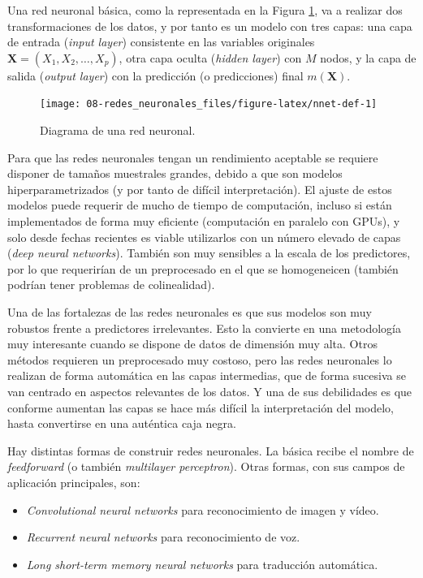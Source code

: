 \documentclass[
]{book}
\theoremstyle{break}
\theoremstyle{nonumberplain}
\begin{document}
Una red neuronal básica, como la representada en la Figura \ref{fig:nnet-def}, va a realizar dos transformaciones de los datos, y por tanto es un modelo con tres capas: una capa de entrada (\emph{input layer}) consistente en las variables originales \(\mathbf{X} = (X_1,X_2,\ldots, X_p)\), otra capa oculta (\emph{hidden layer}) con \(M\) nodos, y la capa de salida (\emph{output layer}) con la predicción (o predicciones) final \(m(\mathbf{X})\).



\begin{figure}[!htb]

{\centering \texttt{[image: 08-redes\_neuronales\_files/figure-latex/nnet-def-1]} 

}

\caption{Diagrama de una red neuronal.}\label{fig:nnet-def}
\end{figure}

Para que las redes neuronales tengan un rendimiento aceptable se requiere disponer de tamaños muestrales grandes, debido a que son modelos hiperparametrizados (y por tanto de difícil interpretación).
El ajuste de estos modelos puede requerir de mucho de tiempo de computación, incluso si están implementados de forma muy eficiente (computación en paralelo con GPUs), y solo desde fechas recientes es viable utilizarlos con un número elevado de capas (\emph{deep neural networks}).
También son muy sensibles a la escala de los predictores, por lo que requerirían de un preprocesado en el que se homogeneicen (también podrían tener problemas de colinealidad).

Una de las fortalezas de las redes neuronales es que sus modelos son muy robustos frente a predictores irrelevantes.
Esto la convierte en una metodología muy interesante cuando se dispone de datos de dimensión muy alta.
Otros métodos requieren un preprocesado muy costoso, pero las redes neuronales lo realizan de forma automática en las capas intermedias, que de forma sucesiva se van centrado en aspectos relevantes de los datos.
Y una de sus debilidades es que conforme aumentan las capas se hace más difícil la interpretación del modelo, hasta convertirse en una auténtica caja negra.

Hay distintas formas de construir redes neuronales.
La básica recibe el nombre de \emph{feedforward} (o también \emph{multilayer perceptron}).
Otras formas, con sus campos de aplicación principales, son:

\begin{itemize}
\item
  \emph{Convolutional neural networks} para reconocimiento de imagen y vídeo.
\item
  \emph{Recurrent neural networks} para reconocimiento de voz.
\item
  \emph{Long short-term memory neural networks} para traducción automática.
\end{itemize}
\end{document}
